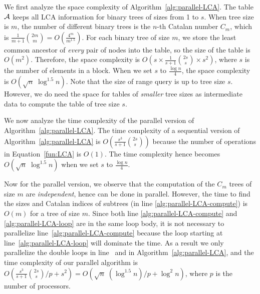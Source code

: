 We first analyze the space complexity of
Algorithm~\ref{alg:parallel-LCA}.  The table $\cal A$ keeps all LCA
information for binary trees of sizes from 1 to $s$.  When tree size
is $m$, the number of different binary trees is the $n$-th Catalan
number $C_m$, which is $\frac{1}{m+1}\binom{2m}{m} =
O(\frac{4^m}{m^{1.5}})$.  For each binary tree of size $m$, we store
the least common ancestor of {\em every} pair of nodes into the table,
so the size of the table is $O(m^2)$.  Therefore, the space complexity
is $O(s \times \frac{1}{s+1}\binom{2s}{s} \times s^2)$, where $s$ is
the number of elements in a block.  When we set $s$ to $\frac{\log
  n}{4}$, the space complexity is $O(\sqrt{n} \; \log ^{1.5} n)$.  Note
that the size of range query is up to tree size $s$.  However, we do
need the space for tables of {\em smaller} tree sizes as intermediate
data to compute the table of tree size $s$.

We now analyze the time complexity of the parallel version of
Algorithm~\ref{alg:parallel-LCA}.  The time complexity of a sequential
version of Algorithm~\ref{alg:parallel-LCA} is $O(\frac{s^3}{s+1}
\binom{2s}{s})$ because the number of operations in
Equation~\ref{fun:LCA} is $O(1)$.  The time complexity hence becomes
$O(\sqrt{n} \; \log ^{1.5} n)$ when we set $s$ to $\frac{\log n}{4}$.

Now for the parallel version, we observe that the computation of the
$C_m$ trees of size $m$ are {\em independent}, hence can be done in
parallel.  However, the time to find the sizes and Catalan indices of
subtrees (in line \ref{alg:parallel-LCA-compute}) is $O(m)$ for a tree
of size $m$.  Since both line \ref{alg:parallel-LCA-compute} and
\ref{alg:parallel-LCA-loop} are in the same loop body, it is not
necessary to parallelize line~\ref{alg:parallel-LCA-compute} because the
loop starting at line~\ref{alg:parallel-LCA-loop} will dominate the
time.  As a result we only parallelize the double loops in
line~\label{alg:parallel-LCA-for-2} and \label{alg:parallel-LCA-for-3}
in Algorithm~\ref{alg:parallel-LCA}, and the time complexity of our
parallel algorithm is $O(\frac{s^3}{s+1} \binom{2s}{s} / p + s^2) =
O(\sqrt{n} \; (\log^{1.5} n) / p + \log^2 n )$, where $p$ is the number
of processors.



